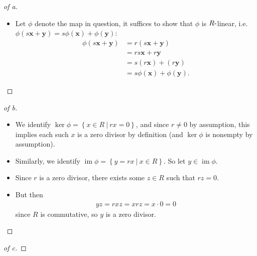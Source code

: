 \begin{solution}

\envlist

\begin{proof}[of a]

\envlist

\begin{itemize}
\tightlist
\item
  Let \(\phi\) denote the map in question, it suffices to show that
  \(\phi\) is \(R{\hbox{-}}\)linear,
  i.e.~\(\phi(s\mathbf{x} + \mathbf{y}) = s\phi(\mathbf{x}) + \phi(\mathbf{y})\):
  \begin{align*}
  \phi(s\mathbf{x} + \mathbf{y}) 
  &= r(s\mathbf{x} + \mathbf{y}) \\
  &= rs\mathbf{x} + r\mathbf{y} \\
  &= s(r\mathbf{x}) + (r\mathbf{y}) \\
  &= s\phi(\mathbf{x}) + \phi(\mathbf{y})
  .\end{align*}
\end{itemize}

\end{proof}

\begin{proof}[of b]

\envlist

\begin{itemize}
\item
  We identify
  \(\ker \phi = \left\{{x\in R {~\mathrel{\Big|}~}rx = 0}\right\}\), and
  since \(r\neq 0\) by assumption, this implies each such \(x\) is a
  zero divisor by definition (and \(\ker \phi\) is nonempty by
  assumption).
\item
  Similarly, we identify
  \(\operatorname{im}\phi = \left\{{y = rx {~\mathrel{\Big|}~}x\in R}\right\}\).
  So let \(y\in \operatorname{im}\phi\).
\item
  Since \(r\) is a zero divisor, there exists some \(z\in R\) such that
  \(rz = 0\).
\item
  But then
  \begin{align*}
  yz = rxz = xrz = x\cdot 0 = 0
  \end{align*}
  since \(R\) is commutative, so \(y\) is a zero divisor.
\end{itemize}

\end{proof}

\begin{proof}[of c]

\envlist


\end{proof}
\end{solution}
